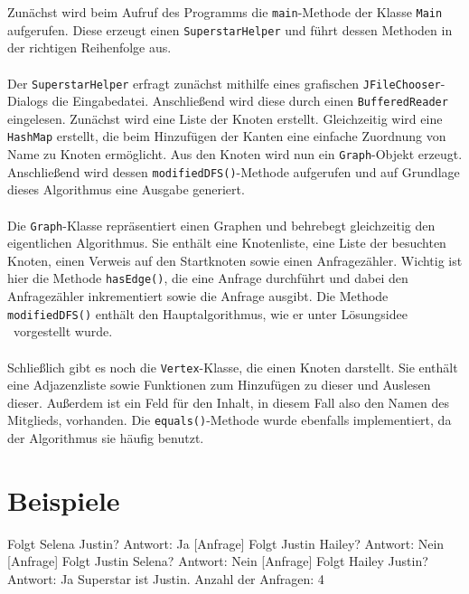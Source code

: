 \documentclass[a4paper, notitlepage, 12pt]{scrartcl}
\begin{document}
Zunächst wird beim Aufruf des Programms die \texttt{main}-Methode der Klasse \texttt{Main} aufgerufen. Diese erzeugt einen \texttt{SuperstarHelper} und führt dessen Methoden in der richtigen Reihenfolge aus. \\ \\
Der \texttt{SuperstarHelper} erfragt zunächst mithilfe eines grafischen \texttt{JFileChooser}-Dialogs die Eingabedatei. Anschließend wird diese durch einen \texttt{BufferedReader} eingelesen. Zunächst wird eine Liste der Knoten erstellt. Gleichzeitig wird eine \texttt{HashMap} erstellt, die beim Hinzufügen der Kanten eine einfache Zuordnung von Name zu Knoten ermöglicht. Aus den Knoten wird nun ein \texttt{Graph}-Objekt erzeugt. Anschließend wird dessen \texttt{modifiedDFS()}-Methode aufgerufen und auf Grundlage dieses Algorithmus eine Ausgabe generiert. \\ \\
Die \texttt{Graph}-Klasse repräsentiert einen Graphen und behrebegt gleichzeitig den eigentlichen Algorithmus. Sie enthält eine Knotenliste, eine Liste der besuchten Knoten, einen Verweis auf den Startknoten sowie einen Anfragezähler. Wichtig ist hier die Methode \texttt{hasEdge()}, die eine Anfrage durchführt und dabei den Anfragezähler inkrementiert sowie die Anfrage ausgibt. Die Methode \texttt{modifiedDFS()} enthält den Hauptalgorithmus, wie er unter \glqq Lösungsidee \grqq ~vorgestellt wurde. \\ \\
Schließlich gibt es noch die \texttt{Vertex}-Klasse, die einen Knoten darstellt. Sie enthält eine Adjazenzliste sowie Funktionen zum Hinzufügen zu dieser und Auslesen dieser. Außerdem ist ein Feld für den Inhalt, in diesem Fall also den Namen des Mitglieds, vorhanden. Die \texttt{equals()}-Methode wurde ebenfalls implementiert, da der Algorithmus sie häufig benutzt.

\section{Beispiele}
 \begin{MyVerbatim}
 [Anfrage] Folgt Selena Justin? Antwort: Ja
 [Anfrage] Folgt Justin Hailey? Antwort: Nein
 [Anfrage] Folgt Justin Selena? Antwort: Nein
 [Anfrage] Folgt Hailey Justin? Antwort: Ja
 Superstar ist Justin.
 Anzahl der Anfragen: 4
 \end{MyVerbatim}
\end{document}
